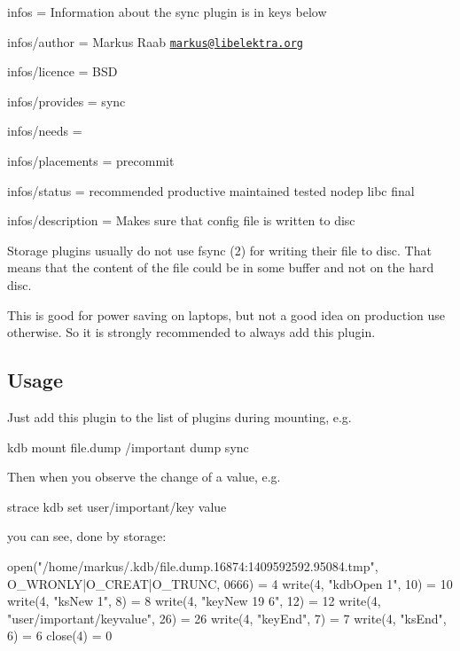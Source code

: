 
\begin{DoxyItemize}
\item infos = Information about the sync plugin is in keys below
\item infos/author = Markus Raab \href{mailto:markus@libelektra.org}{\tt markus@libelektra.\+org}
\item infos/licence = B\+S\+D
\item infos/provides = sync
\item infos/needs =
\item infos/placements = precommit
\item infos/status = recommended productive maintained tested nodep libc final
\item infos/description = Makes sure that config file is written to disc
\end{DoxyItemize}

Storage plugins usually do not use fsync (2) for writing their file to disc. That means that the content of the file could be in some buffer and not on the hard disc.

This is good for power saving on laptops, but not a good idea on production use otherwise. So it is strongly recommended to always add this plugin.

\subsection*{Usage}

Just add this plugin to the list of plugins during mounting, e.\+g. \begin{DoxyVerb}    kdb mount file.dump /important dump sync
\end{DoxyVerb}


Then when you observe the change of a value, e.\+g. \begin{DoxyVerb}    strace kdb set user/important/key value
\end{DoxyVerb}


you can see, done by storage\+: \begin{DoxyVerb}    open("/home/markus/.kdb/file.dump.16874:1409592592.95084.tmp", O_WRONLY|O_CREAT|O_TRUNC, 0666) = 4
    write(4, "kdbOpen 1\n", 10)             = 10
    write(4, "ksNew 1\n", 8)                = 8
    write(4, "keyNew 19 6\n", 12)           = 12
    write(4, "user/important/key\0value\0\n", 26) = 26
    write(4, "keyEnd\n", 7)                 = 7
    write(4, "ksEnd\n", 6)                  = 6
    close(4)                                = 0
\end{DoxyVerb}


